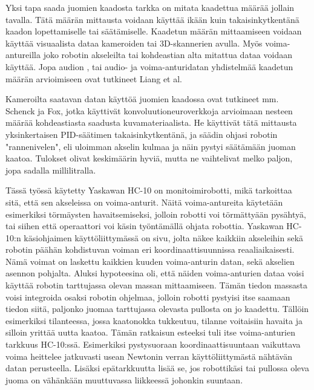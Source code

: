 Yksi tapa saada juomien kaadosta tarkka on mitata kaadettua määrää jollain tavalla. Tätä määrän mittausta voidaan käyttää ikään kuin takaisinkytkentänä kaadon lopettamiselle tai säätämiselle. Kaadetun määrän mittaamiseen voidaan käyttää visuaalista dataa kameroiden tai 3D-skannerien avulla. Myös voima-antureilla joko robotin akseleilta tai kohdeastian alta mitattua dataa voidaan käyttää. Jopa audion \cite{Liang2019}, tai audio- ja voima-anturidatan yhdistelmää \cite{Liang2020} kaadetun määrän arvioimiseen ovat tutkineet Liang et al.

Kameroilta saatavan datan käyttöä juomien kaadossa ovat tutkineet mm. Schenck ja Fox, jotka käyttivät konvoluutioneuroverkkoja arvioimaan nesteen määrää kohdeastiasta saadusta kuvamateriaalista. He käyttivät tätä mittausta yksinkertaisen PID-säätimen takaisinkytkentänä, ja säädin ohjasi robotin "rannenivelen", eli uloimman akselin kulmaa ja näin pystyi säätämään juoman kaatoa. Tulokset olivat keskimäärin hyviä, mutta ne vaihtelivat melko paljon, jopa sadalla millilitralla. \cite{Schenck2016}

Tässä työssä käytetty Yaskawan HC-10 on monitoimirobotti, mikä tarkoittaa sitä, että sen akseleissa on voima-anturit. Näitä voima-antureita käytetään esimerkiksi törmäysten havaitsemiseksi, jolloin robotti voi törmättyään pysähtyä, tai siihen että operaattori voi käsin työntämällä ohjata robottia. Yaskawan HC-10:n käsiohjaimen käyttöliittymässä on sivu, jolta näkee kaikkiin akseleihin sekä robotin päähän kohdistuvan voiman eri koordinaattisuunnissa reaaliaikaisesti. Nämä voimat on laskettu kaikkien kuuden voima-anturin datan, sekä akselien asennon pohjalta. \cite[s.10-11]{Yaskawa} Aluksi hypoteesina oli, että näiden voima-anturien dataa voisi käyttää robotin tarttujassa olevan massan mittaamiseen. Tämän tiedon massasta voisi integroida osaksi robotin ohjelmaa, jolloin robotti pystyisi itse saamaan tiedon siitä, paljonko juomaa tarttujassa olevasta pullosta on jo kaadettu. Tällöin esimerkiksi tilanteessa, jossa kaatonokka tukkeutuu, tilanne voitaisiin havaita ja silloin yrittää uutta kaatoa. Tämän ratkaisun esteeksi tuli itse voima-anturien tarkkuus HC-10:ssä. Esimerkiksi pystysuoraan koordinaattisuuntaan vaikuttava voima heittelee jatkuvasti usean Newtonin verran käyttöliittymästä nähtävän datan perusteella. Lisäksi epätarkkuutta lisää se, jos robottikäsi tai pullossa oleva juoma on vähänkään muuttuvassa liikkeessä johonkin suuntaan.

